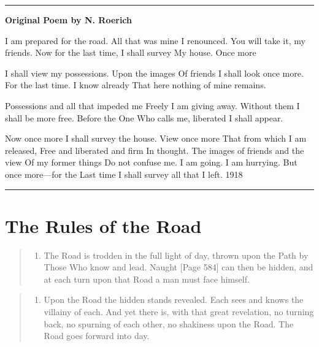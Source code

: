\documentclass[
]{book}
\providecommand{\tightlist}{%
  \setlength{\itemsep}{0pt}\setlength{\parskip}{0pt}}
\begin{document}
\begin{center}\rule{0.5\linewidth}{0.5pt}\end{center}

\textbf{Original Poem by N. Roerich}

I am prepared for the road.
All that was mine I renounced.
You will take it, my friends.
Now for the last time, I shall survey
My house. Once more

I shall view my possessions. Upon the images
Of friends I shall look once more.
For the last time.
I know already
That here nothing of mine remains.

Possessions and all that impeded me
Freely I am giving away. Without them
I shall be more free. Before the One
Who calls me, liberated
I shall appear.

Now once more
I shall survey the house. View once more
That from which I am released,
Free and liberated and firm
In thought. The images of friends and the view
Of my former things
Do not confuse me. I am going. I am hurrying.
But once more---for the
Last time I shall survey all that
I left.
1918

\begin{center}\rule{0.5\linewidth}{0.5pt}\end{center}

\hypertarget{the-rules-of-the-road}{%
\section*{The Rules of the Road}\label{the-rules-of-the-road}}

\begin{quote}
\begin{enumerate}
\def\labelenumi{\arabic{enumi}.}
\tightlist
\item
  The Road is trodden in the full light of day, thrown upon the Path by Those Who know and lead. Naught {[}Page 584{]} can then be hidden, and at each turn upon that Road a man must face himself.
\end{enumerate}
\end{quote}

\begin{quote}
\begin{enumerate}
\def\labelenumi{\arabic{enumi}.}
\setcounter{enumi}{1}
\tightlist
\item
  Upon the Road the hidden stands revealed. Each sees and knows the villainy of each. And yet there is, with that great revelation, no turning back, no spurning of each other, no shakiness upon the Road. The Road goes forward into day.
\end{enumerate}
\end{quote}
\end{document}
